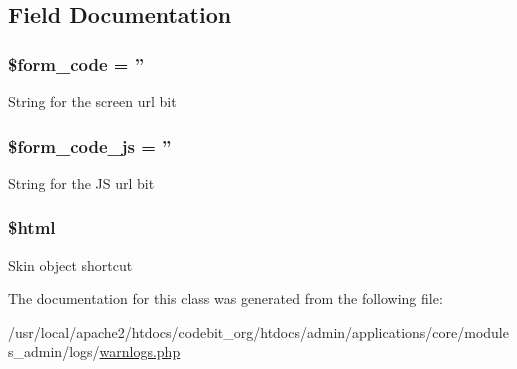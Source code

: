 \subsection{Field Documentation}
\hypertarget{classadmin__core__logs__warnlogs_af28aee726fa3eb6c355d08a2ab655e03}{
\subsubsection[{\$form\-\_\-code}]{\setlength{\rightskip}{0pt plus 5cm}\$form\-\_\-code = ''}}\label{classadmin__core__logs__warnlogs_af28aee726fa3eb6c355d08a2ab655e03}
String for the screen url bit \hypertarget{classadmin__core__logs__warnlogs_ac68fe8a02a2efd63c3271179f4b4fbb7}{
\subsubsection[{\$form\-\_\-code\-\_\-js}]{\setlength{\rightskip}{0pt plus 5cm}\$form\-\_\-code\-\_\-js = ''}}\label{classadmin__core__logs__warnlogs_ac68fe8a02a2efd63c3271179f4b4fbb7}
String for the J\-S url bit \hypertarget{classadmin__core__logs__warnlogs_a6f96e7fc92441776c9d1cd3386663b40}{
\subsubsection[{\$html}]{\setlength{\rightskip}{0pt plus 5cm}\$html}}\label{classadmin__core__logs__warnlogs_a6f96e7fc92441776c9d1cd3386663b40}
Skin object shortcut 

The documentation for this class was generated from the following file\-:\begin{DoxyCompactItemize}
\item 
/usr/local/apache2/htdocs/codebit\-\_\-org/htdocs/admin/applications/core/modules\-\_\-admin/logs/\hyperlink{warnlogs_8php}{warnlogs.\-php}\end{DoxyCompactItemize}
